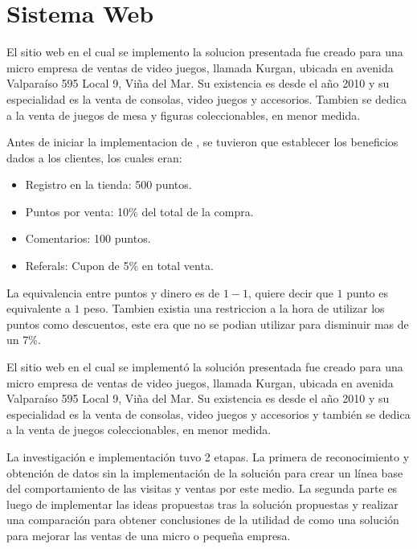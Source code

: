 \section{Sistema Web}


El sitio web en el cual se implemento la solucion presentada fue creado para una micro empresa de
ventas de video juegos, llamada Kurgan, ubicada en avenida Valparaíso 595 Local 9, Viña del Mar.
Su existencia es desde el año 2010 y su especialidad es la venta de consolas, video juegos y
accesorios. Tambien se dedica a la venta de juegos de mesa y figuras coleccionables, en menor medida.

Antes de iniciar la implementacion de {\GAM}, se tuvieron que establecer los beneficios dados a los 
clientes, los cuales eran:

\begin{itemize}

\item Registro en la tienda: 500 puntos.
\item Puntos por venta: 10\% del total de la compra.
\item Comentarios: 100 puntos.
\item Referals: Cupon de 5\% en total venta.

\end{itemize}

La equivalencia entre puntos y dinero es de $1-1$, quiere decir que $1$ punto es equivalente a 
$1$ peso. Tambien existia una restriccion a la hora de utilizar los puntos como descuentos, este 
era que no se podian utilizar para disminuir mas de un 7\%.


El sitio web en el cual se implementó la solución presentada fue creado para una
micro empresa de ventas de video juegos, llamada Kurgan,
ubicada en avenida Valparaíso 595 Local 9, Viña del Mar.
Su existencia es desde el año 2010 y su especialidad es la venta de consolas,
video juegos y accesorios y también se dedica a la venta de juegos coleccionables,
en menor medida.

La investigación e implementación tuvo 2 etapas.
La primera de reconocimiento y obtención de datos sin la implementación de la
solución para crear un línea base del comportamiento de las visitas y ventas por
este medio.
La segunda parte es luego de implementar las ideas propuestas tras la solución
propuestas y realizar una comparación para obtener conclusiones de la utilidad de
{\GAM} como una solución para mejorar las ventas de una micro o pequeña empresa.

